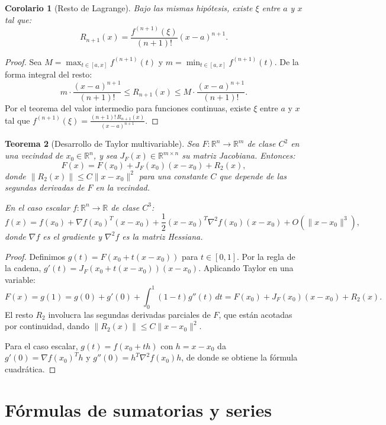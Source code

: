 \documentclass[a4paper,11pt]{report}
\newtheorem{theorem}{Teorema}[chapter]
\newtheorem{corollary}[theorem]{Corolario}
\begin{document}
\begin{corollary}[Resto de Lagrange]\label{cor:taylor_lagrange}
Bajo las mismas hipótesis, existe $\xi$ entre $a$ y $x$ tal que:
\[
R_{n+1}(x) = \frac{f^{(n+1)}(\xi)}{(n+1)!}(x-a)^{n+1}.
\]
\end{corollary}

\begin{proof}
Sea $M = \max_{t \in [a,x]} f^{(n+1)}(t)$ y $m = \min_{t \in [a,x]} f^{(n+1)}(t)$. De la forma integral del resto:
\[
m \cdot \frac{(x-a)^{n+1}}{(n+1)!} \leq R_{n+1}(x) \leq M \cdot \frac{(x-a)^{n+1}}{(n+1)!}.
\]
Por el teorema del valor intermedio para funciones continuas, existe $\xi$ entre $a$ y $x$ tal que $f^{(n+1)}(\xi) = \frac{(n+1)! \, R_{n+1}(x)}{(x-a)^{n+1}}$.
\end{proof}

\begin{theorem}[Desarrollo de Taylor multivariable]\label{thm:taylor_multi}
Sea $F: \mathbb{R}^n \to \mathbb{R}^m$ de clase $C^2$ en una vecindad de $x_0 \in \mathbb{R}^n$, y sea $J_F(x) \in \mathbb{R}^{m \times n}$ su matriz Jacobiana. Entonces:
\[
F(x) = F(x_0) + J_F(x_0)(x - x_0) + R_2(x),
\]
donde $\|R_2(x)\| \leq C\|x - x_0\|^2$ para una constante $C$ que depende de las segundas derivadas de $F$ en la vecindad.

En el caso escalar $f: \mathbb{R}^n \to \mathbb{R}$ de clase $C^3$:
\[
f(x) = f(x_0) + \nabla f(x_0)^T(x - x_0) + \frac{1}{2}(x - x_0)^T \nabla^2 f(x_0) (x - x_0) + O(\|x - x_0\|^3),
\]
donde $\nabla f$ es el gradiente y $\nabla^2 f$ es la matriz Hessiana.
\end{theorem}

\begin{proof}
Definimos $g(t) = F(x_0 + t(x - x_0))$ para $t \in [0,1]$. Por la regla de la cadena, $g'(t) = J_F(x_0 + t(x-x_0))(x-x_0)$. Aplicando Taylor en una variable:
\[
F(x) = g(1) = g(0) + g'(0) + \int_0^1 (1-t) g''(t)\, dt = F(x_0) + J_F(x_0)(x-x_0) + R_2(x).
\]
El resto $R_2$ involucra las segundas derivadas parciales de $F$, que están acotadas por continuidad, dando $\|R_2(x)\| \leq C\|x-x_0\|^2$.

Para el caso escalar, $g(t) = f(x_0 + t h)$ con $h = x - x_0$ da $g'(0) = \nabla f(x_0)^T h$ y $g''(0) = h^T \nabla^2 f(x_0) h$, de donde se obtiene la fórmula cuadrática.
\end{proof}

\section{Fórmulas de sumatorias y series}
\end{document}
